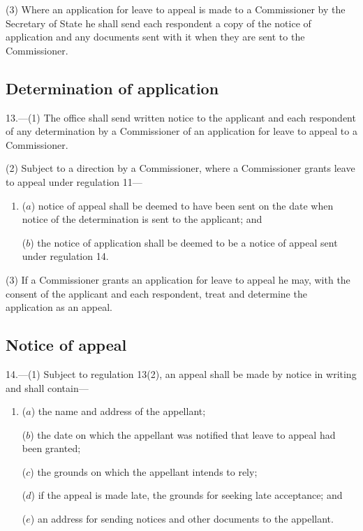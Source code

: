 \documentclass[12pt,a4paper]{article}
\begin{document}
(3) Where an application for leave to appeal is made to a Commissioner by the Secretary of State he shall send each respondent a copy of the notice of application and any documents sent with it when they are sent to the Commissioner.

\subsection[13. Determination of application]{Determination of application}

13.—(1) The office shall send written notice to the applicant and each respondent of any determination by a Commissioner of an application for leave to appeal to a Commissioner.

(2) Subject to a direction by a Commissioner, where a Commissioner grants leave to appeal under regulation 11---
\begin{enumerate}\item[]
($a$) notice of appeal shall be deemed to have been sent on the date when notice of the determination is sent to the applicant; and

($b$) the notice of application shall be deemed to be a notice of appeal sent under regulation 14.
\end{enumerate}

(3) If a Commissioner grants an application for leave to appeal he may, with the consent of the applicant and each respondent, treat and determine the application as an appeal.

\subsection[14. Notice of appeal]{Notice of appeal}

14.—(1) Subject to regulation 13(2), an appeal shall be made by notice in writing and shall contain---
\begin{enumerate}\item[]
($a$) the name and address of the appellant;

($b$) the date on which the appellant was notified that leave to appeal had been granted;

($c$) the grounds on which the appellant intends to rely;

($d$) if the appeal is made late, the grounds for seeking late acceptance; and

($e$) an address for sending notices and other documents to the appellant.
\end{enumerate}
\end{document}
